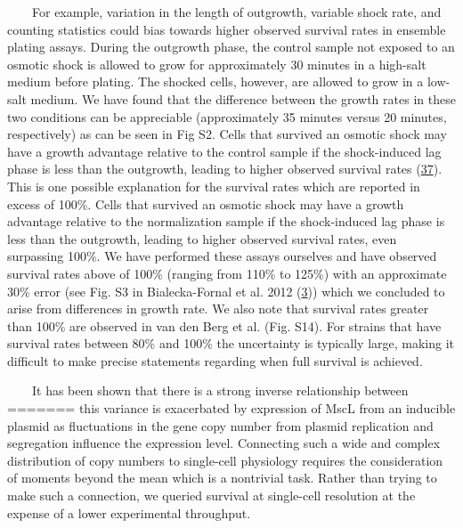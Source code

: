 ~~~~For
example,
variation
in the
length
of
outgrowth,
variable
shock
rate,
and
counting
statistics
could
bias
towards
higher
observed
survival
rates
in
ensemble
plating
assays.
During
the
outgrowth
phase,
the
control
sample
not
exposed
to an
osmotic
shock
is
allowed
to
grow
for
approximately
30
minutes
in a
high-salt
medium
before
plating.
The
shocked
cells,
however,
are
allowed
to
grow
in a
low-salt
medium.
We
have
found
that
the
difference
between
the
growth
rates
in
these
two
conditions
can be
appreciable
(approximately
35
minutes
versus
20
minutes,
respectively)
as can
be
seen
in Fig
S2.
Cells
that
survived
an
osmotic
shock
may
have a
growth
advantage
relative
to the
control
sample
if the
shock-induced
lag
phase
is
less
than
the
outgrowth,
leading
to
higher
observed
survival
rates
(\protect\hyperlink{ref-levina1999}{37}).
This
is one
possible
explanation
for
the
survival
rates
which
are
reported
in
excess
of
100\%.
Cells
that
survived
an
osmotic
shock
may
have a
growth
advantage
relative
to the
normalization
sample
if the
shock-induced
lag
phase
is
less
than
the
outgrowth,
leading
to
higher
observed
survival
rates,
even
surpassing
100\%.
We
have
performed
these
assays
ourselves
and
have
observed
survival
rates
above
of
100\%
(ranging
from
110\%
to
125\%)
with
an
approximate
30\%
error
(see
Fig.
S3 in
Bialecka-Fornal
et al.
2012
(\protect\hyperlink{ref-bialecka-fornal2012}{3}))
which
we
concluded
to
arise
from
differences
in
growth
rate.
We
also
note
that
survival
rates
greater
than
100\%
are
observed
in van
den
Berg
et al.
(Fig.
S14).
For
strains
that
have
survival
rates
between
80\%
and
100\%
the
uncertainty
is
typically
large,
making
it
difficult
to
make
precise
statements
regarding
when
full
survival
is
achieved.

~~~~It
has
been
shown
that
there
is a
strong
inverse
relationship
between
=======
this
variance
is
exacerbated
by
expression
of
MscL
from
an
inducible
plasmid
as
fluctuations
in the
gene
copy
number
from
plasmid
replication
and
segregation
influence
the
expression
level.
Connecting
such a
wide
and
complex
distribution
of
copy
numbers
to
single-cell
physiology
requires
the
consideration
of
moments
beyond
the
mean
which
is a
nontrivial
task.
Rather
than
trying
to
make
such a
connection,
we
queried
survival
at
single-cell
resolution
at the
expense
of a
lower
experimental
throughput.

